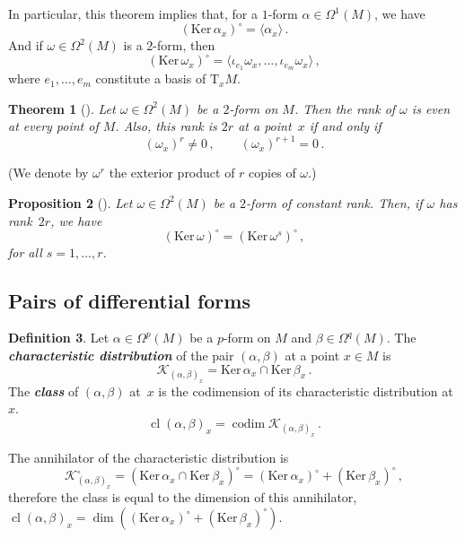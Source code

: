 \documentclass[11pt,twoside]{article}
\theoremstyle{plain}
\newtheorem{theorem}{Theorem}[section]
\newtheorem{proposition}[theorem]{Proposition}
\theoremstyle{definition}
\newtheorem{definition}[theorem]{Definition}
\newcommand{\T}{{\mathrm T}}
\let\Tan\T
\newcommand*{\inn}[1]{\iota_{#1}}
\DeclareMathOperator{\cl}{cl}
\DeclareMathOperator{\codim}{codim}
\newcommand\dfn[1]{{\textbf{\emph{#1}}}}
\def\Ker{\mathrm{Ker \,}}
\def\Tan{\mathrm{T}}
\def\K{\mathcal{K}}
\begin{document}
In particular, this theorem implies that,
for a $1$-form $\alpha\in \Omega^{1} (M)$, we have
$$
(\Ker \alpha_x)^{\circ} = \langle \alpha_x\rangle\,.
$$ 
And if $\omega \in\Omega^2 (M)$ is a $2$-form, then 
$$
(\Ker\omega_x)^{\circ} =  \langle \inn{e_1}\omega_x,\dotsc,\inn{e_m}\omega_x \rangle\,,
$$
where $e_1,\dotsc, e_m$ constitute a basis of $\Tan_xM$.


\begin{theorem}[\cite{god_1969,LM_1987}]
\label{thm:even_rank}
Let $\omega \in \Omega ^2(M)$ be a $2$-form on $M$.
Then the rank of $\omega$ is even at every point of $M$. 
Also, this rank is $2r$ at a point~$x$ if and only if
$$
(\omega_x)^r\neq0\,, \qquad 
(\omega_x)^{r+1}=0\,.
$$
\end{theorem}
(We denote by $\omega^r$ the exterior product of $r$ copies of $\omega$.)


\begin{proposition}[\cite{god_1969}]\label{rank_powers}
    Let $\omega \in \Omega^2(M)$ be a $2$-form of constant rank. Then, if $\omega$ has rank~$2r$, we have
    $$(\Ker \omega)^{\circ}=(\Ker \omega^s)^{\circ}\,,$$
    for all $s=1,\dotsc,r$.
\end{proposition}


\subsection{Pairs of differential forms}


\begin{definition}
Let $\alpha\in \Omega^p(M)$ be a $p$-form on $M$ and $\beta \in \Omega^q(M)$. 
The \dfn{characteristic distribution} of the pair $(\alpha, \beta)$ at a point $x\in M$ is 
$$
\K_{(\alpha,\beta)_x} = \Ker \alpha_x \cap \Ker \beta_x \,.
$$
The \dfn{class} of $(\alpha, \beta)$ at~$x$ is the codimension of its characteristic distribution at~$x$.
$$
\cl(\alpha,\beta)_x = 
\codim \K_{(\alpha,\beta)_x} 
\,.
$$
\end{definition}

The annihilator of the characteristic distribution is
$$
    \K_{(\alpha,\beta)_x}^{\circ} =
    (\Ker \alpha_x \cap \Ker\beta_x)^{\circ} =
    (\Ker \alpha_x)^\circ + (\Ker\beta_x)^{\circ}
\,,
$$
therefore the class is equal to the dimension of this annihilator,
$\cl(\alpha,\beta)_x = 
\dim \left( (\Ker \alpha_x)^\circ + (\Ker\beta_x)^{\circ} \right)
$.
\end{document}
